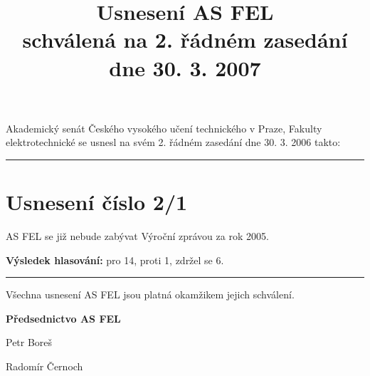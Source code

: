 \documentclass[a4paper,12pt,notitlepage]{article}
\title{Usnesení AS FEL\\schválená na 2. řádném zasedání dne 30. 3. 2007}
\author{}\date{}
\newcommand{\hr}{\bigskip\bigskip\hrule\bigskip\bigskip}
\newcommand{\usneseni}[5]{
\section*{#1}

#2

\textbf{Výsledek hlasování:} pro #3, proti #4, zdržel se #5.}
\begin{document}
\maketitle
\thispagestyle{empty}


Akademický senát Českého vysokého učení technického v Praze, Fakulty
elektrotechnické se usnesl na svém 2. řádném zasedání dne 30. 3. 2006 takto:\hr



\usneseni{Usnesení číslo 2/1}{AS FEL se již nebude zabývat Výroční zprávou za rok 2005.}{14}{1}{6}



\bigskip\bigskip\bigskip\bigskip\bigskip\bigskip\hr
Všechna usnesení AS FEL jsou platná okamžikem jejich schválení.

\begin{center}
\textbf{Předsednictvo AS FEL}

Petr Boreš

Radomír Černoch
\end{center}
\end{document}

